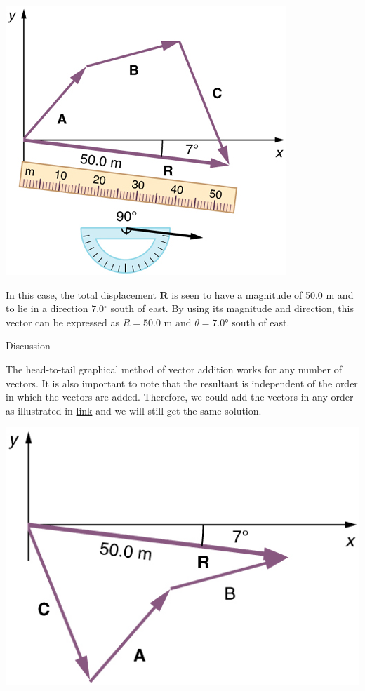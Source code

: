 \documentclass[
]{book}
\begin{document}
\includegraphics{images/Figure_03_02_11a.jpg}

In this case, the total displacement \(\textbf{R}{}\) is seen to have a
magnitude of 50.0 m and to lie in a direction \(7.0{^\circ}{}\) south of
east. By using its magnitude and direction, this vector can be expressed
as \({R = \text{50.0\ m}}{}\) and \({{\theta = 7}\text{.}\text{0°}}{}\)
south of east.

{Discussion}

The head-to-tail graphical method of vector addition works for any
number of vectors. It is also important to note that the resultant is
independent of the order in which the vectors are added. Therefore, we
could add the vectors in any order as illustrated in
\protect\hyperlink{import-auto-id1165298931858}{link} and we will
still get the same solution.

\includegraphics{images/Figure_03_02_12.jpg}
\end{document}
